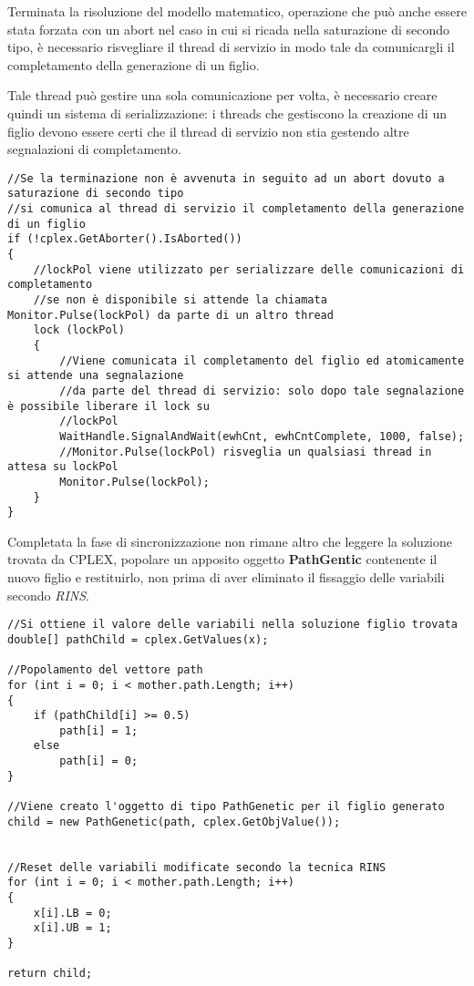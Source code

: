 \documentclass[11pt]{article}
\begin{document}
Terminata la risoluzione del modello matematico, operazione che può anche essere stata forzata con un abort nel caso in cui si ricada nella saturazione di secondo tipo, è necessario risvegliare il thread di servizio in modo tale da comunicargli il completamento della generazione di un figlio. 

Tale thread può gestire una sola comunicazione per volta, è necessario creare quindi un sistema di serializzazione: i threads che gestiscono la creazione di un figlio devono essere certi che il thread di servizio non stia gestendo altre segnalazioni di completamento.

\begin{lstlisting}
//Se la terminazione non è avvenuta in seguito ad un abort dovuto a saturazione di secondo tipo
//si comunica al thread di servizio il completamento della generazione di un figlio
if (!cplex.GetAborter().IsAborted())
{
    //lockPol viene utilizzato per serializzare delle comunicazioni di completamento
    //se non è disponibile si attende la chiamata Monitor.Pulse(lockPol) da parte di un altro thread
    lock (lockPol)
    {
        //Viene comunicata il completamento del figlio ed atomicamente si attende una segnalazione
        //da parte del thread di servizio: solo dopo tale segnalazione è possibile liberare il lock su
        //lockPol
        WaitHandle.SignalAndWait(ewhCnt, ewhCntComplete, 1000, false);
        //Monitor.Pulse(lockPol) risveglia un qualsiasi thread in attesa su lockPol
        Monitor.Pulse(lockPol);
    }
}
\end{lstlisting}

Completata la fase di sincronizzazione non rimane altro che leggere la soluzione trovata da CPLEX, popolare un apposito oggetto \textbf{PathGentic} contenente il nuovo figlio e restituirlo, non prima di aver eliminato il fissaggio delle variabili secondo \textit{RINS}.

\begin{lstlisting}
//Si ottiene il valore delle variabili nella soluzione figlio trovata
double[] pathChild = cplex.GetValues(x);

//Popolamento del vettore path
for (int i = 0; i < mother.path.Length; i++)
{
    if (pathChild[i] >= 0.5)
        path[i] = 1;
    else
        path[i] = 0;
}

//Viene creato l'oggetto di tipo PathGenetic per il figlio generato
child = new PathGenetic(path, cplex.GetObjValue());


//Reset delle variabili modificate secondo la tecnica RINS
for (int i = 0; i < mother.path.Length; i++)
{
    x[i].LB = 0;
    x[i].UB = 1;
}

return child;
\end{lstlisting}
\end{document}
